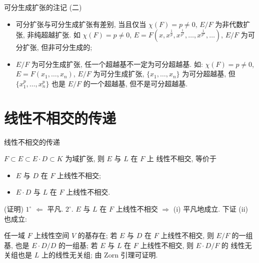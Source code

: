 
\begin{frame}{可分生成扩张的注记 (二)}

\begin{itemize}
\item {} 可分扩张与可分生成扩张有差别, 当且仅当
  $\chi(F) = p \neq 0$, $E/F$ 为非代数扩张, 非纯超越扩张.
  如 $\chi(F) = p \neq 0$,
  $E = F(x, x^{\frac{1}{p}}, x^{\frac{1}{p^2}}, \dots, x^{\frac{1}{p^n}}, \dots)$,
  $E/F$ 为可分扩张, 但非可分生成的;
\item {} $E/F$ 为可分生成扩张, 任一个超越基不一定为可分超越基.
  如: $\chi(F) = p \neq 0$, $E = F(x_1, \dots, x_n)$, $E/F$ 为可分生成扩张,
  $\{ x_1, \dots, x_n \}$ 为可分超越基, 但 $\{ x_1^p, \dots, x_n^p \}$
  也是 $E/F$ 的一个超越基, 但不是可分超越基.
\end{itemize}

\end{frame}


\section[传递]{线性不相交的传递}


\begin{frame}{线性不相交的传递}

\begin{lem}[线性不相交的传递]
$F \subset E \subset E \cdot D \subset K$ 为域扩张, 则 $E$ 与 $L$ 在 $F$ 上
线性不相交, 等价于
\begin{itemize}
\item[(i)] $E$ 与 $D$ 在 $F$ 上线性不相交;
\item[(ii)] $E \cdot D$ 与 $L$ 在 $F$ 上线性不相交.
\end{itemize}
\end{lem}

\startproof[bg=yellow, fg=red](证明)
$1^{\circ}$ $\Longleftarrow$ 平凡.
$2^{\circ}$. $E$ 与 $L$ 在 $F$ 上线性不相交 $\Longrightarrow$ (i)
平凡地成立. 下证 (ii) 也成立:

\pause

 任一域 $F$ 上线性空间 $V$ 的基存在;
 若 $E$ 与 $D$ 在 $F$ 上线性不相交, 则 $E/F$ 的一组基,
也是 $E \cdot D/D$ 的一组基;
 若 $E$ 与 $L$ 在 $F$ 上线性不相交, 则 $E \cdot D/F$ 的
线性无关组也是 $L$ 上的线性无关组;
 由 Zorn 引理可证明.

\end{frame}

